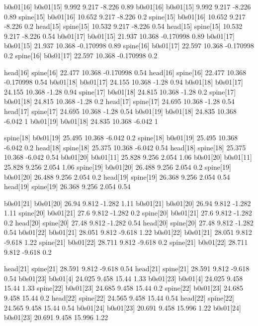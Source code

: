 b0s01[16]    b0s01[15]    9.992    9.217    -8.226    0.89
b0s01[16]    b0s01[15]    9.992    9.217    -8.226    0.89
spine[15]    b0s01[16]    10.652    9.217    -8.226    0.2
spine[15]    b0s01[16]    10.652    9.217    -8.226    0.2
head[15]    spine[15]    10.532    9.217    -8.226    0.54
head[15]    spine[15]    10.532    9.217    -8.226    0.54
b0s01[17]    b0s01[15]    21.937    10.368    -0.170998    0.89
b0s01[17]    b0s01[15]    21.937    10.368    -0.170998    0.89
spine[16]    b0s01[17]    22.597    10.368    -0.170998    0.2
spine[16]    b0s01[17]    22.597    10.368    -0.170998    0.2


head[16]    spine[16]    22.477    10.368    -0.170998    0.54
head[16]    spine[16]    22.477    10.368    -0.170998    0.54
b0s01[18]    b0s01[17]    24.155    10.368    -1.28    0.94
b0s01[18]    b0s01[17]    24.155    10.368    -1.28    0.94
spine[17]    b0s01[18]    24.815    10.368    -1.28    0.2
spine[17]    b0s01[18]    24.815    10.368    -1.28    0.2
head[17]    spine[17]    24.695    10.368    -1.28    0.54
head[17]    spine[17]    24.695    10.368    -1.28    0.54
b0s01[19]    b0s01[18]    24.835    10.368    -6.042    1
b0s01[19]    b0s01[18]    24.835    10.368    -6.042    1


spine[18]    b0s01[19]    25.495    10.368    -6.042    0.2
spine[18]    b0s01[19]    25.495    10.368    -6.042    0.2
head[18]    spine[18]    25.375    10.368    -6.042    0.54
head[18]    spine[18]    25.375    10.368    -6.042    0.54
b0s01[20]    b0s01[11]    25.828    9.256    2.054    1.06
b0s01[20]    b0s01[11]    25.828    9.256    2.054    1.06
spine[19]    b0s01[20]    26.488    9.256    2.054    0.2
spine[19]    b0s01[20]    26.488    9.256    2.054    0.2
head[19]    spine[19]    26.368    9.256    2.054    0.54
head[19]    spine[19]    26.368    9.256    2.054    0.54


b0s01[21]    b0s01[20]    26.94    9.812    -1.282    1.11
b0s01[21]    b0s01[20]    26.94    9.812    -1.282    1.11
spine[20]    b0s01[21]    27.6    9.812    -1.282    0.2
spine[20]    b0s01[21]    27.6    9.812    -1.282    0.2
head[20]    spine[20]    27.48    9.812    -1.282    0.54
head[20]    spine[20]    27.48    9.812    -1.282    0.54
b0s01[22]    b0s01[21]    28.051    9.812    -9.618    1.22
b0s01[22]    b0s01[21]    28.051    9.812    -9.618    1.22
spine[21]    b0s01[22]    28.711    9.812    -9.618    0.2
spine[21]    b0s01[22]    28.711    9.812    -9.618    0.2


head[21]    spine[21]    28.591    9.812    -9.618    0.54
head[21]    spine[21]    28.591    9.812    -9.618    0.54
b0s01[23]    b0s01[4]    24.025    9.458    15.44    1.33
b0s01[23]    b0s01[4]    24.025    9.458    15.44    1.33
spine[22]    b0s01[23]    24.685    9.458    15.44    0.2
spine[22]    b0s01[23]    24.685    9.458    15.44    0.2
head[22]    spine[22]    24.565    9.458    15.44    0.54
head[22]    spine[22]    24.565    9.458    15.44    0.54
b0s01[24]    b0s01[23]    20.691    9.458    15.996    1.22
b0s01[24]    b0s01[23]    20.691    9.458    15.996    1.22


